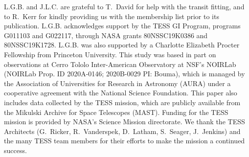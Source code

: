 \documentclass[12pt,modern,tighten]{aastex63}
\begin{document}
L.G.B{.} and J.L.C{.} are grateful to T{.}~David for help with the
transit fitting, and to R{.}~Kerr for kindly providing us with the
\citet{Kerr2021} membership list prior to its publication.
%
L.G.B{.} acknowledges support by the TESS GI Program, programs
G011103 and G022117, through NASA grants 80NSSC19K0386 and
80NSSC19K1728.
%
L.G.B{.} was also supported by a Charlotte Elizabeth Procter
Fellowship from Princeton University.
%
This study was based in part on observations at Cerro Tololo
Inter-American Observatory at NSF's NOIRLab (NOIRLab Prop{.} ID
2020A-0146; 2020B-0029 PI: Bouma), which is managed by the
Association of Universities for Research in Astronomy (AURA) under a
cooperative agreement with the National Science Foundation.
%
%
This paper also includes data collected by the TESS mission, which are
publicly available from the Mikulski Archive for Space Telescopes
(MAST).
%
Funding for the TESS mission is provided by NASA's Science Mission
directorate.
%
We thank the TESS Architects (G.~Ricker, R.~Vanderspek, D.~Latham,
S.~Seager, J.~Jenkins) and the many TESS team members for their
efforts to make the mission a continued success.
%

%
%


%
\end{document}
